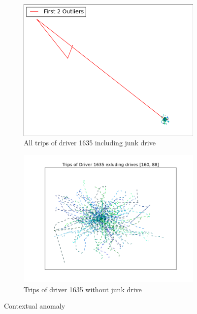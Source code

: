 \documentclass{vldb}
\begin{document}
\begin{figure}
\begin{subfigure}{\linewidth}
	\centering
	\includegraphics[width=0.8\linewidth]{"pics/outliers_junk/D_1635_unclean"}
	\caption{All trips of driver 1635 including junk drive}
	\label{fig:d-1635-junk}
\end{subfigure}
\begin{subfigure}{\linewidth}
  \centering
	\includegraphics[width=\linewidth]{"pics/outliers_junk/D_1635_clean"} %
	\caption{Trips of driver 1635 without junk drive}
	\label{fig:d-1635}
\end{subfigure}
\caption{Contextual anomaly}
\label{fig:contextual-anomaly}
\end{figure}
\end{document}
